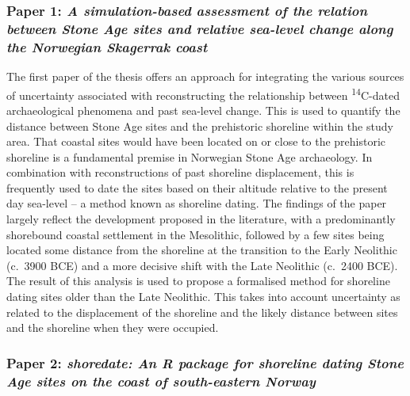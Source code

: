 \documentclass[
  a4paper,
  oneside]{uiophdthesis}
\begin{document}
\hypertarget{paper-1-a-simulation-based-assessment-of-the-relation-between-stone-age-sites-and-relative-sea-level-change-along-the-norwegian-skagerrak-coast}{%
\subsubsection{\texorpdfstring{Paper 1: \emph{A simulation-based assessment of the relation between Stone Age sites and relative sea-level change along the Norwegian Skagerrak coast}}{Paper 1: A simulation-based assessment of the relation between Stone Age sites and relative sea-level change along the Norwegian Skagerrak coast}}\label{paper-1-a-simulation-based-assessment-of-the-relation-between-stone-age-sites-and-relative-sea-level-change-along-the-norwegian-skagerrak-coast}}

The first paper of the thesis offers an approach for integrating the various sources of uncertainty associated with reconstructing the relationship between \textsuperscript{14}C-dated archaeological phenomena and past sea-level change. This is used to quantify the distance between Stone Age sites and the prehistoric shoreline within the study area. That coastal sites would have been located on or close to the prehistoric shoreline is a fundamental premise in Norwegian Stone Age archaeology. In combination with reconstructions of past shoreline displacement, this is frequently used to date the sites based on their altitude relative to the present day sea-level -- a method known as shoreline dating. The findings of the paper largely reflect the development proposed in the literature, with a predominantly shorebound coastal settlement in the Mesolithic, followed by a few sites being located some distance from the shoreline at the transition to the Early Neolithic (c.~3900 BCE) and a more decisive shift with the Late Neolithic (c.~2400 BCE). The result of this analysis is used to propose a formalised method for shoreline dating sites older than the Late Neolithic. This takes into account uncertainty as related to the displacement of the shoreline and the likely distance between sites and the shoreline when they were occupied.

\hypertarget{paper-2-shoredate-an-r-package-for-shoreline-dating-stone-age-sites-on-the-coast-of-south-eastern-norway}{%
\subsubsection{\texorpdfstring{Paper 2: \emph{shoredate: An R package for shoreline dating Stone Age sites on the coast of south-eastern Norway}}{Paper 2: shoredate: An R package for shoreline dating Stone Age sites on the coast of south-eastern Norway}}\label{paper-2-shoredate-an-r-package-for-shoreline-dating-stone-age-sites-on-the-coast-of-south-eastern-norway}}
\end{document}

